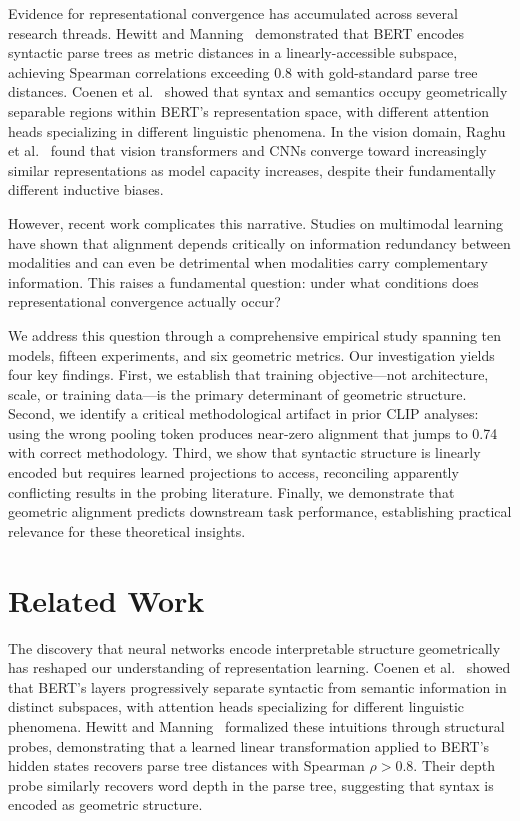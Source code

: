 \documentclass{article}
\begin{document}
Evidence for representational convergence has accumulated across several research threads. Hewitt and Manning~\cite{hewitt2019structural} demonstrated that BERT encodes syntactic parse trees as metric distances in a linearly-accessible subspace, achieving Spearman correlations exceeding 0.8 with gold-standard parse tree distances. Coenen et al.~\cite{coenen2019visualizing} showed that syntax and semantics occupy geometrically separable regions within BERT's representation space, with different attention heads specializing in different linguistic phenomena. In the vision domain, Raghu et al.~\cite{raghu2021vision} found that vision transformers and CNNs converge toward increasingly similar representations as model capacity increases, despite their fundamentally different inductive biases.

However, recent work complicates this narrative. Studies on multimodal learning~\cite{emergence2024multimodal} have shown that alignment depends critically on information redundancy between modalities and can even be detrimental when modalities carry complementary information. This raises a fundamental question: under what conditions does representational convergence actually occur?

We address this question through a comprehensive empirical study spanning ten models, fifteen experiments, and six geometric metrics. Our investigation yields four key findings. First, we establish that training objective---not architecture, scale, or training data---is the primary determinant of geometric structure. Second, we identify a critical methodological artifact in prior CLIP analyses: using the wrong pooling token produces near-zero alignment that jumps to 0.74 with correct methodology. Third, we show that syntactic structure is linearly encoded but requires learned projections to access, reconciling apparently conflicting results in the probing literature. Finally, we demonstrate that geometric alignment predicts downstream task performance, establishing practical relevance for these theoretical insights.

\section{Related Work}

The discovery that neural networks encode interpretable structure geometrically has reshaped our understanding of representation learning. Coenen et al.~\cite{coenen2019visualizing} showed that BERT's layers progressively separate syntactic from semantic information in distinct subspaces, with attention heads specializing for different linguistic phenomena. Hewitt and Manning~\cite{hewitt2019structural} formalized these intuitions through structural probes, demonstrating that a learned linear transformation applied to BERT's hidden states recovers parse tree distances with Spearman $\rho > 0.8$. Their depth probe similarly recovers word depth in the parse tree, suggesting that syntax is encoded as geometric structure.
\end{document}
